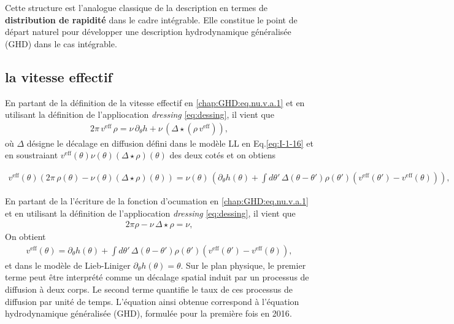 \medskip

Cette structure est l’analogue classique de la description en termes de {\bf distribution de rapidité} dans le cadre intégrable. Elle constitue le point de départ naturel pour développer une description hydrodynamique généralisée (GHD) dans le cas intégrable.


\subsection{la vitesse effectif}

En partant de la définition de la vitesse effectif en \eqref{chap:GHD:eq.nu.v.a.1} et en utilisant la définition de l'appliocation \emph{dressing} \eqref{eq:dessing}, il vient que 
\begin{eqnarray}\label{chap:GHD:veff.1}
	2 \pi \, v^{\mathrm{eff}} \,   \rho   = \nu  \,  \partial_\theta h   + \nu  \,  \left ( \Delta \star ( \rho \,  v^{\mathrm{eff}} )  \right ) ,
\end{eqnarray}
où $\Delta$ désigne le décalage en diffusion défini dans le modèle LL  en Eq.\eqref{eq:I-1-16}
et en soustraiant $v^{\mathrm{eff}} ( \theta ) \nu (\theta) \left ( \Delta \star  \rho  \right )( \theta )$ des deux cotés et on obtiens 

\begin{eqnarray}\label{chap:GHD:veff.2}
	v^{\mathrm{eff}} ( \theta )  \left (  2\pi \, \rho ( \theta ) - \nu (\theta) \left ( \Delta \star  \rho  \right )( \theta ) \right )    = \nu( \theta )  \,  \left (  \partial_\theta h ( \theta )  +  \int d \theta' \, \Delta(\theta - \theta') \rho ( \theta') ( v^{\mathrm{eff}} ( \theta' ) - v^{\mathrm{eff}} ( \theta )  )   \right )  ,
\end{eqnarray}

En partant de la l'écriture de la fonction d'ocumation en \eqref{chap:GHD:eq.nu.v.a.1} et en utilisant la définition de l'appliocation \emph{dressing} \eqref{eq:dessing}, il vient que 
\begin{eqnarray}\label{chap:GHD:veff.3}
	2 \pi \rho - \nu \, 	\Delta \star  \rho = \nu, 
\end{eqnarray}
On obtient 
\begin{eqnarray}\label{chap:GHD:veff.4}
	v^{\mathrm{eff}} ( \theta )      =  \partial_\theta h ( \theta )   +  \int d \theta' \, \Delta(\theta - \theta') \rho ( \theta') ( v^{\mathrm{eff}} ( \theta' ) - v^{\mathrm{eff}} ( \theta )  )   ,
\end{eqnarray}
et dans le modèle de Lieb-Liniger $\partial_\theta h ( \theta )   = \theta$.
Sur le plan physique, le premier terme peut être interprété comme un décalage spatial induit par un processus de diffusion à deux corps. Le second terme quantifie le taux de ces processus de diffusion par unité de temps. L’équation ainsi obtenue correspond à l’équation hydrodynamique généralisée (GHD), formulée pour la première fois en 2016\cite{Bertini2016,CastroAlvaredo2016}.

